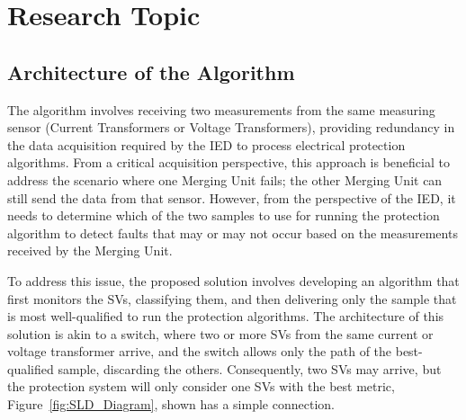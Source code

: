 \chapter{Research Topic} %
\section{Architecture of the Algorithm}

The algorithm involves receiving two measurements from the same measuring sensor (Current Transformers or Voltage Transformers), providing redundancy in the data acquisition required by the IED to process electrical protection algorithms. From a critical acquisition perspective, this approach is beneficial to address the scenario where one Merging Unit fails; the other Merging Unit can still send the data from that sensor. However, from the perspective of the IED, it needs to determine which of the two samples to use for running the protection algorithm to detect faults that may or may not occur based on the measurements received by the Merging Unit.

To address this issue, the proposed solution involves developing an algorithm that first monitors the SVs, classifying them, and then delivering only the sample that is most well-qualified to run the protection algorithms. The architecture of this solution is akin to a switch, where two or more SVs from the same current or voltage transformer arrive, and the switch allows only the path of the best-qualified sample, discarding the others. Consequently, two SVs may arrive, but the protection system will only consider one SVs with the best metric, Figure~\ref{fig:SLD_Diagram}, shown has a simple connection.

